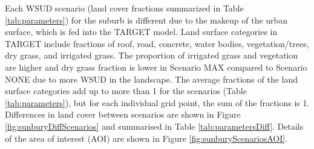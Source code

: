 \documentclass[final,3p,times,authoryear]{elsarticle}
\begin{document}
Each WSUD scenario (land cover fractions summarized in Table \ref{tab:parameters}) for the suburb is different due to the makeup of the urban surface, which is fed into the TARGET model. Land surface categories in TARGET include fractions of roof, road, concrete, water bodies, vegetation/trees, dry grass, and irrigated grass. The proportion of irrigated grass and vegetation are higher and dry grass fraction is lower in Scenario MAX compared to Scenario NONE due to more WSUD in the landscape. The average fractions of the land surface categories add up to more than 1 for the scenarios (Table \ref{tab:parameters}), but for each individual grid point, the sum of the fractions is 1. Differences in land cover between scenarios are shown in Figure  \ref{fig:sunburyDiffScenarios} and summarised in Table \ref{tab:parametersDiff}. Details of the area of interest (AOI) are shown in Figure  \ref{fig:sunburyScenariosAOI}.
\end{document}
